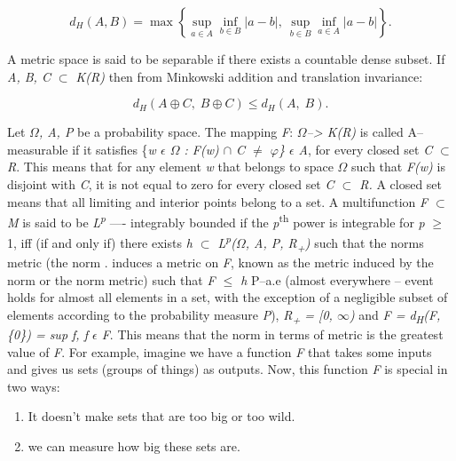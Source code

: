 \documentclass[12pt,a4paper]{report}
\numberwithin{equation}{section}
\begin{document}
\begin{equation}\label{eq:5.1.3}
d_{H}(A,B)
= \max\left\{
\sup_{a\in A}\inf_{b\in B}|a-b|,
\ \sup_{b\in B}\inf_{a\in A}|a-b|
\right\}.
\end{equation}


A metric space is said to be separable if there exists a countable dense
subset. If \emph{A, B, C $\subset$ K(R)} then from Minkowski addition and
translation invariance:

\begin{equation}\label{eq:5.1.4}
d_H(A\oplus C,\;B\oplus C)\le d_H(A,\;B).
\end{equation}



Let \emph{$\Omega$, A, P} be a probability space. The mapping \emph{F}:
\emph{$\Omega$--\textgreater{} K(R)} is called A--measurable if it satisfies
\{\emph{w $\epsilon$ $\Omega$ : F(w) $\cap$ C $\neq$ $\varphi$\} $\epsilon$ A}, for every closed set \emph{C $\subset$ R}.
This means that for any element \emph{w} that belongs to space \emph{$\Omega$}
such that \emph{F(w)} is disjoint with \emph{C}, it is not equal to zero
for every closed set \emph{C $\subset$ R.} A closed set means that all limiting
and interior points belong to a set. A multifunction \emph{F $\subset$ M} is
said to be \emph{L\textsuperscript{p}} ---- integrably bounded if the
\emph{p}\textsuperscript{th} power is integrable for \emph{p} $\geq$ 1, iff
(if and only if) there exists \emph{h $\subset$ L\textsuperscript{p}($\Omega$, A, P,
R\textsubscript{+})} such that the norms metric (the norm
\textbar\textbar.\textbar\textbar{} induces a metric on \emph{F}, known
as the metric induced by the norm or the norm metric) such that
\emph{\textbar\textbar F\textbar\textbar{} $\leq$ h} P--a.e (almost everywhere
-- event holds for almost all elements in a set, with the exception of a
negligible subset of elements according to the probability measure
\emph{P}), \emph{R\textsubscript{+} = {[}0, $\infty$)} and
\emph{\textbar\textbar F\textbar\textbar{} = d\textsubscript{H}(F,
\{0\}) = sup \textbar f\textbar, f $\epsilon$ F}. This means that the norm in
terms of metric is the greatest value of \emph{F}. For example, imagine
we have a function \emph{F} that takes some inputs and gives us sets
(groups of things) as outputs. Now, this function \emph{F} is special in
two ways:

\begin{enumerate}
\def\labelenumi{\roman{enumi}.}
\item
  It doesn't make sets that are too big or too wild.
\item
  we can measure how big these sets are.
\end{enumerate}
\end{document}
